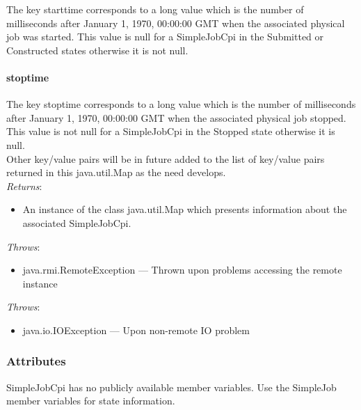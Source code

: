 \documentclass[$Date: 2003/06/26 19:29:31 $]{glabarticle}
\begin{document}
The key starttime corresponds to a long value which is the
number of milliseconds after January 1, 1970, 00:00:00 GMT when the
associated physical job was started. This value is null for a
SimpleJobCpi in the Submitted or Constructed states otherwise it is not
null.

\paragraph{stoptime} 

The key stoptime corresponds to a long value which is the
number of milliseconds after January 1, 1970, 00:00:00 GMT when the
associated physical job stopped. This value is not null for a
SimpleJobCpi in the Stopped state otherwise it is null. \\

Other key/value pairs will be in future added to the list of key/value
pairs returned in this java.util.Map as the need develops. \\

 \textit{Returns}:
 \begin{itemize}
 \item[] An instance of the class java.util.Map which presents information about the associated SimpleJobCpi.
 \end{itemize} 

 \textit{Throws}:
 \begin{itemize}
 \item[] java.rmi.RemoteException --- Thrown upon problems accessing the remote instance 
 \end{itemize}

\textit{Throws}:
\begin{itemize}
\item[] java.io.IOException --- Upon non-remote IO problem 
\end{itemize}


\subsubsection{Attributes}

SimpleJobCpi has no publicly available member variables. Use the SimpleJob member variables for state
information. 


\end{document}
